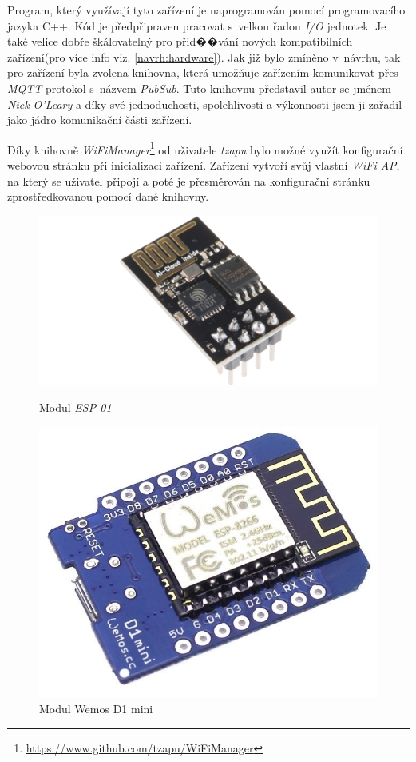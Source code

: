 Program, který využívají tyto zařízení je naprogramován pomocí programovacího jazyka C++.
Kód je předpřipraven pracovat s~velkou řadou \emph{I/O} jednotek.
Je také velice dobře škálovatelný pro přid��vání nových kompatibilních zařízení(pro více info viz. \ref{navrh:hardware}).
Jak již bylo zmíněno v~návrhu, tak pro zařízení byla zvolena knihovna, která umožňuje zařízením komunikovat přes \emph{MQTT} protokol s~názvem \emph{PubSub}.
Tuto knihovnu představil autor se jménem \emph{Nick O'Leary} a díky své jednoduchosti, spolehlivosti a výkonnosti jsem ji zařadil jako jádro komunikační části zařízení.

Díky knihovně \emph{WiFiManager}\footnote{\url{https://www.github.com/tzapu/WiFiManager}} od uživatele \emph{tzapu} bylo možné využít konfigurační webovou stránku při inicializaci zařízení.
Zařízení vytvoří svůj vlastní \emph{WiFi AP}, na který se uživatel připojí a poté je přesměrován na konfigurační stránku zprostředkovanou pomocí dané knihovny.

\begin{figure}[hbt]
  \centering
  \includegraphics[width=.8\linewidth]{obrazky-figures/esp-01.png}
  \caption{Modul \emph{ESP-01}}
  \label{figure:esp01}
  \endminipage

  \hfill
  \centering
  \includegraphics[width=.7\linewidth]{obrazky-figures/wemos.jpg}
  \caption{Modul Wemos D1 mini}
  \label{figure:wemos}
  \endminipage
\end{figure}

